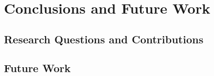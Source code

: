 \setlength{\headheight}{1.2cm}
\renewcommand{\publ}{\flushleft\footnotesize{}}

\chapter{Conclusions and Future Work}\label{chap:8}

\section{Research Questions and Contributions}

\section{Future Work}



